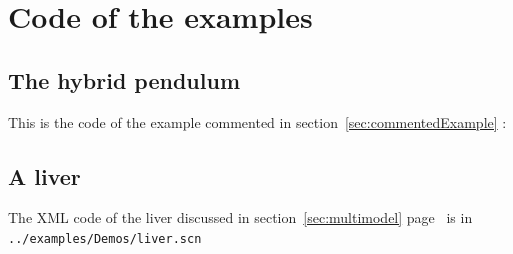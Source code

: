 \section{Code of the examples}
\subsection{The hybrid pendulum}\label{cpp:hybrid}
This is the code of the example commented in section~\ref{sec:commentedExample} :

\subsection{A liver}\label{xml:liver}
The XML code of the liver discussed in section~\ref{sec:multimodel} page~\pageref{bla:liver} is in \texttt{../examples/Demos/liver.scn}

% 
%
% 
%
% 
%
% 

